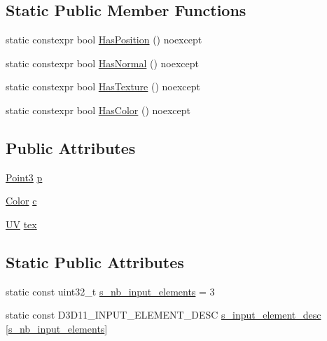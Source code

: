 \subsection*{Static Public Member Functions}
\begin{DoxyCompactItemize}
\item 
static constexpr bool \hyperlink{structmage_1_1_vertex_position_color_texture_aa80fcb7271cfe6bb2d89b0a7655e8984}{Has\+Position} () noexcept
\item 
static constexpr bool \hyperlink{structmage_1_1_vertex_position_color_texture_ab6b754deb3139e8b669daae14ae67ba8}{Has\+Normal} () noexcept
\item 
static constexpr bool \hyperlink{structmage_1_1_vertex_position_color_texture_aac2da4c1e9233e6c480c4629718f0a1e}{Has\+Texture} () noexcept
\item 
static constexpr bool \hyperlink{structmage_1_1_vertex_position_color_texture_a3eeee863375fee721cbb8e516a582a1e}{Has\+Color} () noexcept
\end{DoxyCompactItemize}
\subsection*{Public Attributes}
\begin{DoxyCompactItemize}
\item 
\hyperlink{structmage_1_1_point3}{Point3} \hyperlink{structmage_1_1_vertex_position_color_texture_a145c2e2fce90b07252b778b46e31ea24}{p}
\item 
\hyperlink{structmage_1_1_color}{Color} \hyperlink{structmage_1_1_vertex_position_color_texture_afb9ec100ec42e83e501448d4bb0ee4f8}{c}
\item 
\hyperlink{structmage_1_1_u_v}{UV} \hyperlink{structmage_1_1_vertex_position_color_texture_adfbaa105e46bb65f502ec33eaa2e8b15}{tex}
\end{DoxyCompactItemize}
\subsection*{Static Public Attributes}
\begin{DoxyCompactItemize}
\item 
static const uint32\+\_\+t \hyperlink{structmage_1_1_vertex_position_color_texture_a6b05ba63dce3ba54ad4b1b39b3c6f4f8}{s\+\_\+nb\+\_\+input\+\_\+elements} = 3
\item 
static const D3\+D11\+\_\+\+I\+N\+P\+U\+T\+\_\+\+E\+L\+E\+M\+E\+N\+T\+\_\+\+D\+E\+SC \hyperlink{structmage_1_1_vertex_position_color_texture_a19df72ffa15fae0b389b9f66d7b8f3bd}{s\+\_\+input\+\_\+element\+\_\+desc} \mbox{[}\hyperlink{structmage_1_1_vertex_position_color_texture_a6b05ba63dce3ba54ad4b1b39b3c6f4f8}{s\+\_\+nb\+\_\+input\+\_\+elements}\mbox{]}
\end{DoxyCompactItemize}


